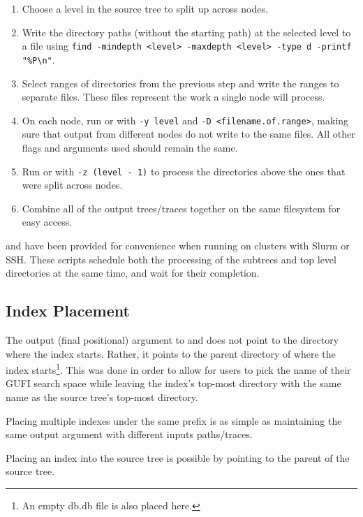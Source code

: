 \begin{enumerate}
\item Choose a level in the source tree to split up across nodes.
\item Write the directory paths (without the starting path) at the
  selected level to a file using \texttt{find -mindepth <level>
    -maxdepth <level> -type d -printf "\%P\textbackslash n"}.
\item Select ranges of directories from the previous step and write
  the ranges to separate files. These files represent the work a
  single node will process.
\item On each node, run \gufidirindex or \gufidirtrace with \texttt{-y
  level} and \texttt{-D <filename.of.range>}, making sure that output
  from different nodes do not write to the same files. All other flags
  and arguments used should remain the same.
\item Run \gufidirindex or \gufidirtrace with \texttt{-z (level - 1)}
  to process the directories above the ones that were split across
  nodes.
\item Combine all of the output trees/traces together on the same
  filesystem for easy access.
\end{enumerate}

\gufidirindexdistributed and \gufidirtracedistributed have been
provided for convenience when running on clusters with Slurm or
SSH. These scripts schedule both the processing of the subtrees and
top level directories at the same time, and wait for their completion.

\subsection{Index Placement}
The output (final positional) argument to \gufidirindex and
\gufitraceindex does not point to the directory where the index
starts. Rather, it points to the parent directory of where the index
starts\footnote{An empty db.db file is also placed here.}. This was
done in order to allow for users to pick the name of their GUFI search
space while leaving the index's top-most directory with the same name
as the source tree's top-most directory.

Placing multiple indexes under the same prefix is as simple as
maintaining the same output argument with different inputs
paths/traces.

Placing an index into the source tree is possible by pointing
\gufidirindex to the parent of the source tree.

